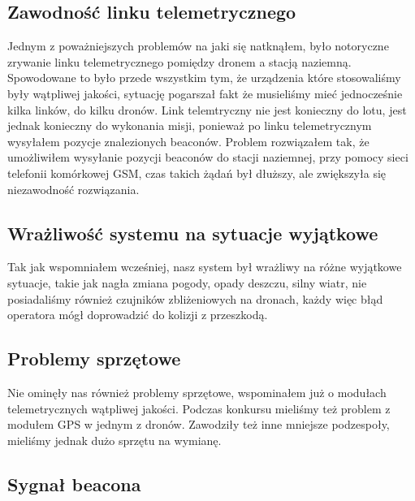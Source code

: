 \subsection{Zawodność linku telemetrycznego}

Jednym z poważniejszych problemów na jaki się natknąłem, było notoryczne zrywanie linku telemetrycznego pomiędzy dronem a stacją naziemną. Spowodowane to było przede wszystkim tym, że urządzenia które stosowaliśmy były wątpliwej jakości, sytuację pogarszał fakt że musieliśmy mieć jednocześnie kilka linków, do kilku dronów. Link telemtryczny nie jest konieczny do lotu, jest jednak konieczny do wykonania misji, ponieważ po linku telemetrycznym wysyłałem pozycje znalezionych beaconów. Problem rozwiązałem tak, że umożliwiłem wysyłanie pozycji beaconów do stacji naziemnej, przy pomocy sieci telefonii komórkowej GSM, czas takich żądań był dłuższy, ale zwiększyła się niezawodność rozwiązania.

\subsection{Wrażliwość systemu na sytuacje wyjątkowe}

Tak jak wspomniałem wcześniej, nasz system był wrażliwy na różne wyjątkowe sytuacje, takie jak nagła zmiana pogody, opady deszczu, silny wiatr, nie posiadaliśmy również czujników zbliżeniowych na dronach, każdy więc błąd operatora mógł doprowadzić do kolizji z przeszkodą. 

\subsection{Problemy sprzętowe}

Nie ominęły nas również problemy sprzętowe, wspominałem już o modułach telemetrycznych wątpliwej jakości. Podczas konkursu mieliśmy też problem z modułem GPS w jednym z dronów. Zawodziły też inne mniejsze podzespoły, mieliśmy jednak dużo sprzętu na wymianę.

\subsection{Sygnał beacona}

